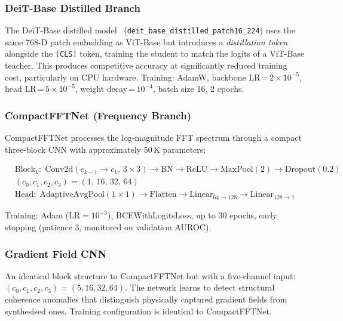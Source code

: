 \documentclass[12pt, a4paper]{article}
\begin{document}
\subsubsection{DeiT-Base Distilled Branch}

The DeiT-Base distilled model~\cite{touvron2021deit}
(\texttt{deit\_base\_distilled\_patch16\_224}) uses the same 768-D patch
embedding as ViT-Base but introduces a \emph{distillation token} alongside the
\texttt{[CLS]} token, training the student to match the logits of a ViT-Base
teacher.  This produces competitive accuracy at significantly reduced training
cost, particularly on CPU hardware.  Training: AdamW, backbone
LR\,=\,$2\!\times\!10^{-5}$, head LR\,=\,$5\!\times\!10^{-5}$,
weight decay\,=\,$10^{-4}$, batch size 16, 2 epochs.

\subsubsection{CompactFFTNet (Frequency Branch)}

CompactFFTNet processes the log-magnitude FFT spectrum through a compact
three-block CNN with approximately 50\,K parameters:

\begin{align}
  &\text{Block}_k:\;
    \mathrm{Conv2d}(c_{k-1}\!\to\! c_k,\,3\!\times\!3)\to
    \mathrm{BN}\to\mathrm{ReLU}\to
    \mathrm{MaxPool}(2)\to\mathrm{Dropout}(0.2) \\
  &(c_0,c_1,c_2,c_3) = (1,\,16,\,32,\,64) \\
  &\text{Head}:\;
    \mathrm{AdaptiveAvgPool}(1\!\times\!1)\to
    \mathrm{Flatten}\to
    \mathrm{Linear}_{64\to128}\to
    \mathrm{Linear}_{128\to1}
\end{align}

Training: Adam ($\mathrm{LR}=10^{-3}$), BCEWithLogitsLoss, up to 30 epochs,
early stopping (patience 3, monitored on validation AUROC).

\subsubsection{Gradient Field CNN}

An identical block structure to CompactFFTNet but with a five-channel input:
$(c_0,c_1,c_2,c_3)=(5,16,32,64)$.  The network learns to detect structural
coherence anomalies that distinguish physically captured gradient fields from
synthesised ones.  Training configuration is identical to CompactFFTNet.

\end{document}
